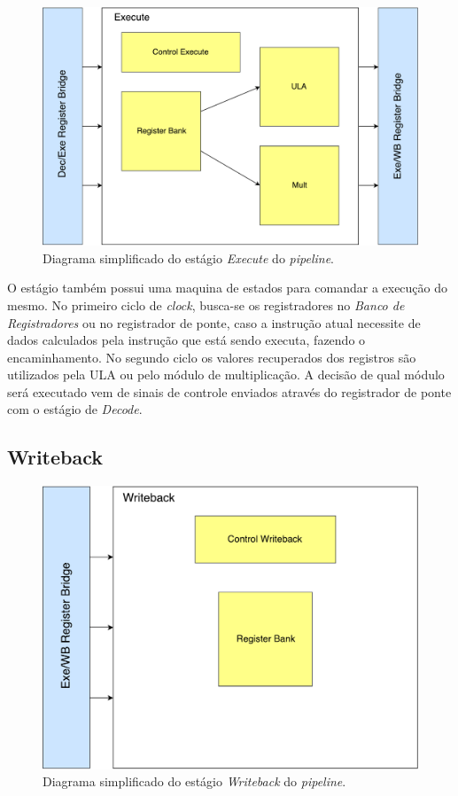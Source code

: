 \documentclass[11pt,a4paper,titlepage]{article}
\begin{document}
\begin{figure}[!h]
\centering
\includegraphics[scale=0.4]{images/executepipe.pdf}
\caption{Diagrama simplificado do estágio \textit{Execute} do \textit{pipeline}.}
\label{fig:executepipe}
\end{figure}

O estágio também possui uma maquina de estados para comandar a execução do mesmo. No primeiro ciclo de \textit{clock}, busca-se os registradores no \textit{Banco de Registradores} ou no registrador de ponte, caso a instrução atual necessite de dados calculados pela instrução que está sendo executa, fazendo o encaminhamento. No segundo ciclo os valores recuperados dos registros são utilizados pela ULA ou pelo módulo de multiplicação. A decisão de qual módulo será executado vem de sinais de controle enviados através do registrador de ponte com o estágio de \textit{Decode}.

\subsection{Writeback}



\begin{figure}[!h]
\centering
\includegraphics[scale=0.4]{images/writebackpipe.pdf}
\caption{Diagrama simplificado do estágio \textit{Writeback} do \textit{pipeline}.}
\label{fig:writebackpipe}
\end{figure}
\end{document}
